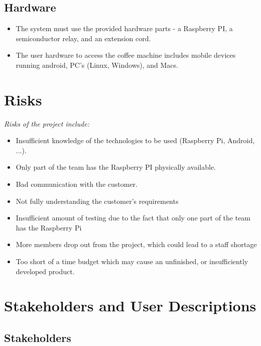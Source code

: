 \subsection{Hardware}

\begin{itemize}
\item The system must use the provided hardware parts - a Raspberry PI, a semiconductor relay, and an extension cord.
\item The user hardware to access the coffee machine includes mobile devices running android, PC's (Linux, Windows), and Macs. %
\end{itemize}

\section{Risks}

\textit{Risks of the project include:}

\begin{itemize}

\item Insufficient knowledge of the technologies to be used (Raspberry Pi,
Android, ...).
\item Only part of the team has the Raspberry PI physically available.
\item Bad communication with the customer.
\item Not fully understanding the customer's requirements 
\item Insufficient amount of testing due to the fact that only one part of the team has the Raspberry Pi
\item More members drop out from the project, which could lead to a staff shortage
\item Too short of a time budget which may cause an unfinished, or insufficiently developed product.
\end{itemize}

\clearpage

\section{Stakeholders and User Descriptions}

\subsection{Stakeholders}

